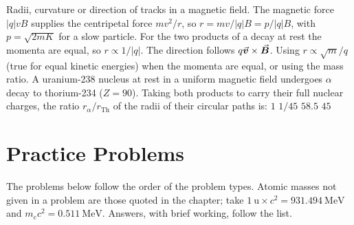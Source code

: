 {Radii, curvature or direction of tracks in a magnetic field.}
{The magnetic force $|q|vB$ supplies the centripetal force $mv^2/r$, so $r=mv/|q|B=p/|q|B$, with
$p=\sqrt{2mK}$ for a slow particle. For the two products of a decay at rest the momenta are equal, so
$r\propto1/|q|$. The direction follows $q\vec{\bm{v}}\times\vec{\bm{B}}$.}
{Using $r\propto\sqrt m/q$ (true for equal kinetic energies) when the momenta are equal, or using the mass
ratio.}
{A uranium-238 nucleus at rest in a uniform magnetic field undergoes $\alpha$ decay to thorium-234 ($Z=90$).
Taking both products to carry their full nuclear charges, the ratio $r_\alpha/r_{\mathrm{Th}}$ of the radii
of their circular paths is:}
{$1$}
{$1/45$}
{$58.5$}
{$45$}

\section{Practice Problems}\label{sec:practice-decay}

The problems below follow the order of the problem types. Atomic masses not given in a problem are those
quoted in the chapter; take $\SI{1}{\amu}\times c^2=\SI{931.494}{\MeV}$ and $m_ec^2=\SI{0.511}{\MeV}$.
Answers, with brief working, follow the list.

